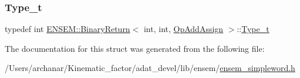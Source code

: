 \mbox{\label{structENSEM_1_1BinaryReturn_3_01int_00_01int_00_01OpAddAssign_01_4_a59ccfa49f2916c58be8fcfb51e252c15}} 
\subsubsection{\texorpdfstring{Type\_t}{Type\_t}\hspace{0.1cm}{\footnotesize\ttfamily [2/2]}}
{\footnotesize\ttfamily typedef int \mbox{\hyperlink{structENSEM_1_1BinaryReturn}{E\+N\+S\+E\+M\+::\+Binary\+Return}}$<$ int, int, \mbox{\hyperlink{structENSEM_1_1OpAddAssign}{Op\+Add\+Assign}} $>$\+::\mbox{\hyperlink{structENSEM_1_1BinaryReturn_3_01int_00_01int_00_01OpAddAssign_01_4_a59ccfa49f2916c58be8fcfb51e252c15}{Type\+\_\+t}}}



The documentation for this struct was generated from the following file\+:\begin{DoxyCompactItemize}
\item 
/\+Users/archanar/\+Kinematic\+\_\+factor/adat\+\_\+devel/lib/ensem/\mbox{\hyperlink{lib_2ensem_2ensem__simpleword_8h}{ensem\+\_\+simpleword.\+h}}\end{DoxyCompactItemize}

